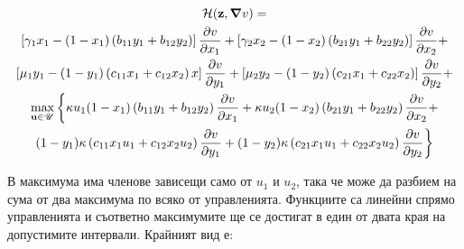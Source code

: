 \begin{multline}
  \label{eq:HamiltonianFull}
  \mathcal{H}(\mathbf{z}, \grad{v}) = \\
  \left[\gamma_1 x_1 - (1-x_1) \left(b_{11} y_1 + b_{12} y_2\right) \right] \pdv{v}{x_1} +
  \left[\gamma_2 x_2 - (1-x_2) \left(b_{21} y_1 + b_{22} y_2\right) \right] \pdv{v}{x_2} + \\
  \left[\mu_1 y_1 - (1-y_1) \left(c_{11} x_1 + c_{12} x_2\right) x\right] \pdv{v}{y_1} +
  \left[\mu_2 y_2 - (1-y_2) \left(c_{21} x_1 + c_{22} x_2\right)\right] \pdv{v}{y_2} + \\
  \max_{\mathbf{u} \in \mathscr{U}} \bigg\{\kappa u_1(1-x_1) \left(b_{11} y_1 + b_{12} y_2\right) \pdv{v}{x_1} +
    \kappa u_2 (1-x_2) \left(b_{21} y_1 + b_{22} y_2\right) \pdv{v}{x_2} + \\
    (1-y_1) \kappa \left(c_{11} x_1 u_1 + c_{12} x_2 u_2 \right) \pdv{v}{y_1}+
  (1-y_2) \kappa \left(c_{21} x_1 u_1 + c_{22} x_2 u_2 \right) \pdv{v}{y_2}\bigg\}
\end{multline}

В максимума има членове зависещи само от $u_1$ и $u_2$, така че може да разбием на сума от два максимума по всяко от управленията. Функциите са линейни спрямо управленията и съответно максимумите ще се достигат в един от двата края на допустимите интервали. Крайният вид е:

